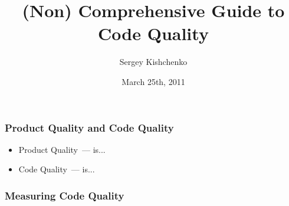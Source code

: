 \documentclass{beamer}
\title{(Non) Comprehensive Guide to Code Quality}
\author{Sergey Kishchenko}
\date{March 25th, 2011}
\institute{Quickoffice}
\begin{document}
\frame{\titlepage}
\begin{frame} 
\frametitle{Product Quality and Code Quality}
\begin{itemize}
\item Product Quality~--- is...
\item Code Quality~--- is...
\end{itemize}
\end{frame} 

\begin{frame}
\frametitle{Measuring Code Quality}
\end{frame}
\end{document}
